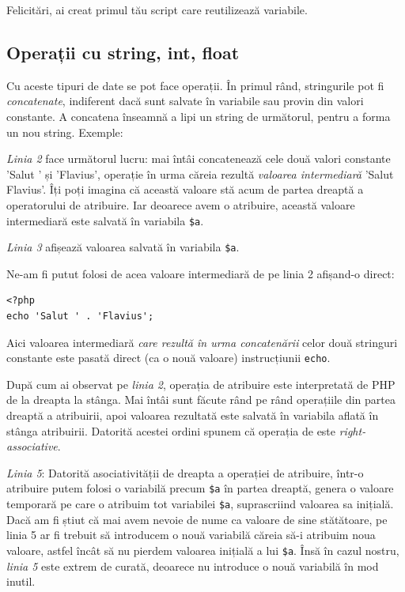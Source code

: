 Felicitări, ai creat primul tău script care reutilizează variabile.

\subsection{Operații cu string, int, float}
Cu aceste tipuri de date se pot face operații. În primul rând,
stringurile pot fi \textsl{concatenate}, indiferent dacă sunt salvate
în variabile sau provin din valori constante. A concatena
înseamnă a lipi un string de următorul, pentru a forma un nou string.
Exemple:


\textit{Linia 2} face următorul lucru: mai întâi concatenează cele două valori constante
'Salut ' și 'Flavius', operație în urma căreia rezultă \textsl{valoarea intermediară}
'Salut Flavius'. Îți poți imagina că această valoare stă acum de partea
dreaptă a operatorului de atribuire. Iar deoarece avem o atribuire, această
valoare intermediară este salvată în variabila \texttt{\$a}.

\textit{Linia 3} afișează valoarea salvată în variabila \texttt{\$a}.

Ne-am fi putut folosi de acea {\glqq}valoare intermediară{\grqq} de pe linia 2 afișand-o direct:
\begin{lstlisting}
<?php
echo 'Salut ' . 'Flavius';
\end{lstlisting}
Aici valoarea intermediară \textit{care rezultă în urma concatenării} celor două stringuri
constante este pasată direct (ca o nouă valoare) instrucțiunii \texttt{echo}.

După cum ai observat pe \textit{linia 2}, operația de atribuire este interpretată
de PHP de la dreapta la stânga. Mai întâi sunt făcute rând pe rând operațiile
din partea dreaptă a atribuirii, apoi valoarea rezultată este salvată în
variabila aflată în stânga atribuirii. Datorită acestei ordini spunem că
operația de  este \textsl{right-associative}.

\textit{Linia 5}: Datorită asociativității de dreapta a operației de atribuire,
într-o atribuire putem folosi o variabilă precum \texttt{\$a} în partea dreaptă, genera
o valoare temporară pe care o atribuim tot variabilei \texttt{\$a}, suprascriind
valoarea sa inițială. Dacă am fi știut că mai avem nevoie de nume ca valoare
de sine stătătoare, pe linia 5 ar fi trebuit să introducem o nouă variabilă
căreia să-i atribuim noua valoare,
astfel încât să nu pierdem valoarea inițială a lui \texttt{\$a}.
Însă în cazul nostru, \textit{linia 5} este extrem de curată,
deoarece nu introduce o nouă variabilă în mod inutil.

